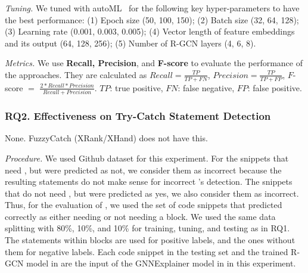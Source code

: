 {\em Tuning.} We tuned {\tool} with autoML~\cite{NNI} for the
following key hyper-parameters to have the best performance: (1) Epoch
size (50, 100, 150); (2) Batch size (32, 64, 128); (3) Learning rate
(0.001, 0.003, 0.005); (4) Vector length of feature embeddings and its
output (64, 128, 256); (5) Number of R-GCN layers (4, 6, 8).

{\em Metrics.} We use \textbf{Recall, Precision}, and {\bf F-score} to
evaluate the performance of the approaches. They are calculated as
$Recall = \frac{TP}{TP+FN}$, $Precision = \frac{TP}{TP+FP}$, $F$-score
$=$ $\frac{2*Recall*Precision}{Recall+Precision}$. $TP$: true
positive, $FN$: false negative, $FP$: false positive.

\subsubsection{RQ2. Effectiveness on Try-Catch Statement Detection\\}

 None. FuzzyCatch (XRank/XHand) does not have
this.

{\em Procedure.} We used Github dataset for this experiment. For the
snippets that need , but were predicted as not, we
consider them as incorrect because the resulting statements do not
make sense for incorrect {\xblock}'s detection. The snippets that do not
need , but were predicted as yes, we also consider
them as incorrect. Thus, for the evaluation of {\xstate}, we used the
set of code snippets that {\xblock} predicted correctly as either
needing or not needing a  block. We used the same data
splitting with 80\%, 10\%, and 10\% for training, tuning, and testing
as in RQ1.  The statements within  blocks are used for
positive labels, and the ones without them for negative labels. Each
code snippet in the testing set and the trained R-GCN model in
{\xblock} are the input of the GNNExplainer model in {\xstate} in this
experiment.


